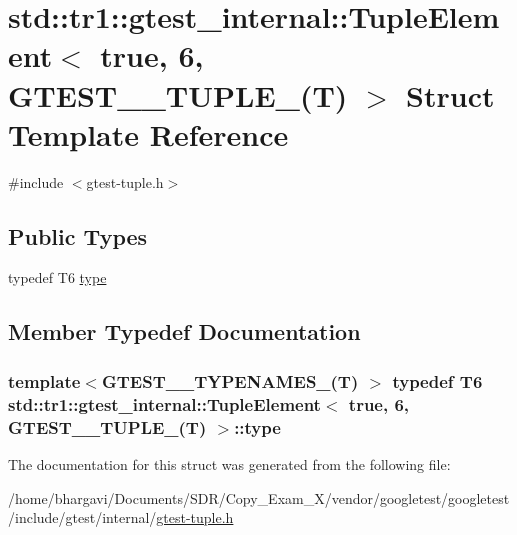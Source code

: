 \hypertarget{structstd_1_1tr1_1_1gtest__internal_1_1_tuple_element_3_01true_00_016_00_01_g_t_e_s_t__10___t_u_p_l_e___07_t_08_01_4}{}\section{std\+:\+:tr1\+:\+:gtest\+\_\+internal\+:\+:Tuple\+Element$<$ true, 6, G\+T\+E\+S\+T\+\_\+\_\+\+T\+U\+P\+L\+E\+\_\+(T) $>$ Struct Template Reference}
\label{structstd_1_1tr1_1_1gtest__internal_1_1_tuple_element_3_01true_00_016_00_01_g_t_e_s_t__10___t_u_p_l_e___07_t_08_01_4}


{\ttfamily \#include $<$gtest-\/tuple.\+h$>$}

\subsection*{Public Types}
\begin{DoxyCompactItemize}
\item 
typedef T6 \hyperlink{structstd_1_1tr1_1_1gtest__internal_1_1_tuple_element_3_01true_00_016_00_01_g_t_e_s_t__10___t_u_p_l_e___07_t_08_01_4_a929a5e4d1a751f3d1a5780643f69a121}{type}
\end{DoxyCompactItemize}


\subsection{Member Typedef Documentation}
\subsubsection[{\texorpdfstring{type}{type}}]{\setlength{\rightskip}{0pt plus 5cm}template$<$G\+T\+E\+S\+T\+\_\+\_\+\+T\+Y\+P\+E\+N\+A\+M\+E\+S\+\_\+(\+T) $>$ typedef T6 {\bf std\+::tr1\+::gtest\+\_\+internal\+::\+Tuple\+Element}$<$ true, 6, {\bf G\+T\+E\+S\+T\+\_\+\_\+\+T\+U\+P\+L\+E\+\_\+}(T) $>$\+::{\bf type}}\hypertarget{structstd_1_1tr1_1_1gtest__internal_1_1_tuple_element_3_01true_00_016_00_01_g_t_e_s_t__10___t_u_p_l_e___07_t_08_01_4_a929a5e4d1a751f3d1a5780643f69a121}{}\label{structstd_1_1tr1_1_1gtest__internal_1_1_tuple_element_3_01true_00_016_00_01_g_t_e_s_t__10___t_u_p_l_e___07_t_08_01_4_a929a5e4d1a751f3d1a5780643f69a121}


The documentation for this struct was generated from the following file\+:\begin{DoxyCompactItemize}
\item 
/home/bhargavi/\+Documents/\+S\+D\+R/\+Copy\+\_\+\+Exam\+\_\+X/vendor/googletest/googletest/include/gtest/internal/\hyperlink{gtest-tuple_8h}{gtest-\/tuple.\+h}\end{DoxyCompactItemize}
